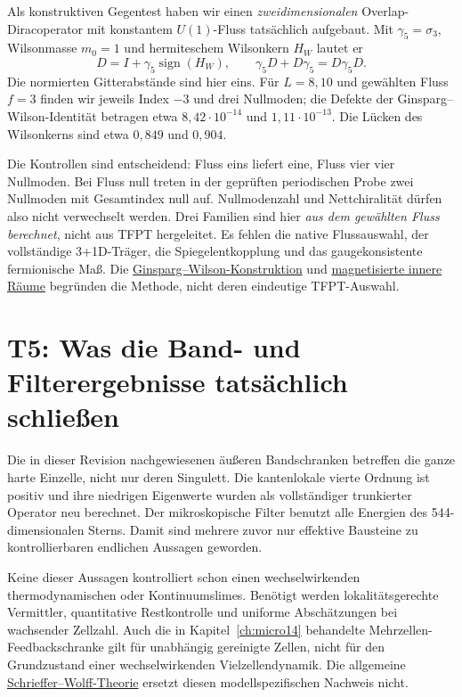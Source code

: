 Als konstruktiven Gegentest haben wir einen \emph{zweidimensionalen} Overlap-Diracoperator mit konstantem $U(1)$-Fluss tatsächlich aufgebaut. Mit $\gamma_5=\sigma_3$, Wilsonmasse $m_0=1$ und hermiteschem Wilsonkern $H_W$ lautet er
\begin{equation}
D=I+\gamma_5\operatorname{sign}(H_W),\qquad
\gamma_5D+D\gamma_5=D\gamma_5D.
\end{equation}
Die normierten Gitterabstände sind hier eins. Für $L=8,10$ und gewählten Fluss $f=3$ finden wir jeweils Index $-3$ und drei Nullmoden; die Defekte der Ginsparg--Wilson-Identität betragen etwa $8{,}42\cdot10^{-14}$ und $1{,}11\cdot10^{-13}$. Die Lücken des Wilsonkerns sind etwa $0{,}849$ und $0{,}904$.

Die Kontrollen sind entscheidend: Fluss eins liefert eine, Fluss vier vier Nullmoden. Bei Fluss null treten in der geprüften periodischen Probe zwei Nullmoden mit Gesamtindex null auf. Nullmodenzahl und Nettchiralität dürfen also nicht verwechselt werden. Drei Familien sind hier \emph{aus dem gewählten Fluss berechnet}, nicht aus TFPT hergeleitet. Es fehlen die native Flussauswahl, der vollständige 3+1D-Träger, die Spiegelentkopplung und das gaugekonsistente fermionische Maß. Die \href{https://arxiv.org/abs/hep-lat/9802011}{Ginsparg--Wilson-Konstruktion} und \href{https://arxiv.org/abs/hep-th/0404229}{magnetisierte innere Räume} begründen die Methode, nicht deren eindeutige TFPT-Auswahl.

\section{T5: Was die Band- und Filterergebnisse tatsächlich schließen}
Die in dieser Revision nachgewiesenen äußeren Bandschranken betreffen die ganze harte Einzelle, nicht nur deren Singulett. Die kantenlokale vierte Ordnung ist positiv und ihre niedrigen Eigenwerte wurden als vollständiger trunkierter Operator neu berechnet. Der mikroskopische Filter benutzt alle Energien des 544-dimensionalen Sterns. Damit sind mehrere zuvor nur effektive Bausteine zu kontrollierbaren endlichen Aussagen geworden.

Keine dieser Aussagen kontrolliert schon einen wechselwirkenden thermodynamischen oder Kontinuumslimes. Benötigt werden lokalitätsgerechte Vermittler, quantitative Restkontrolle und uniforme Abschätzungen bei wachsender Zellzahl. Auch die in Kapitel~\ref{ch:micro14} behandelte Mehrzellen-Feedbackschranke gilt für unabhängig gereinigte Zellen, nicht für den Grundzustand einer wechselwirkenden Vielzellendynamik. Die allgemeine \href{https://arxiv.org/abs/1105.0675}{Schrieffer--Wolff-Theorie} ersetzt diesen modellspezifischen Nachweis nicht.


